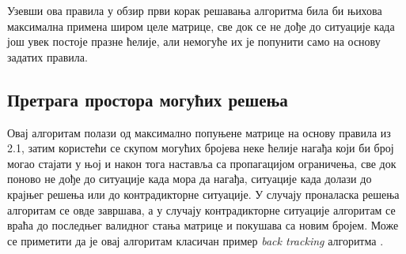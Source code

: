 Узевши ова правила у обзир први корак решавања алгоритма била би њихова максимална примена широм целе матрице, све док се не дође до ситуације када још увек постоје празне ћелије, али немогуће их је попунити само на основу задатих правила.

\subsection{Претрага простора могућих решења}

Овај алгоритам полази од максимално попуњене матрице на основу правила из 2.1, затим користећи се скупом могућих бројева неке ћелије нагађа који би број могао стајати у њој и након тога наставља са пропагацијом ограничења, све док поново не дође до ситуације када мора да нагађа, ситуације када долази до крајњег решења или до контрадикторне ситуације. У случају проналаска решења алгоритам се овде завршава, а у случају контрадикторне ситуације алгоритам се враћа до последњег валидног стања матрице и покушава са новим бројем. Може се приметити да је овај алгоритам класичан пример \textit{back tracking} алгоритма \cite{backtrack}.\\